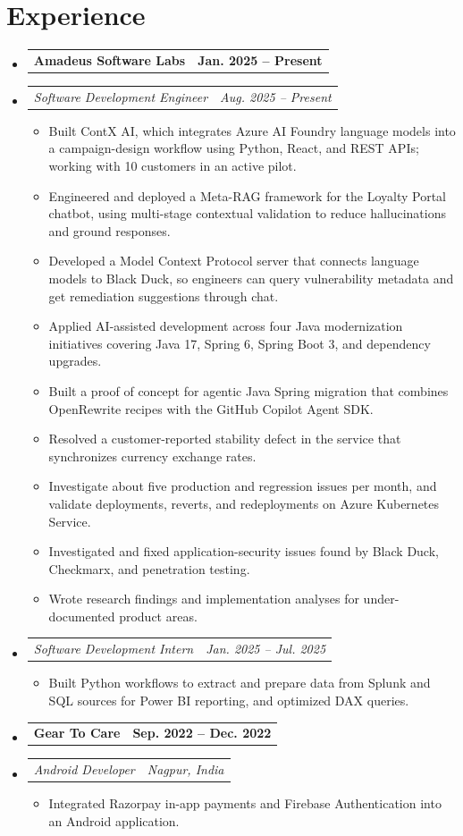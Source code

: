 \documentclass[a4paper,11pt]{article}
\makeatletter
\newcommand{\bulletpoint}[1]{\item\small{#1}}
\newcommand{\company}[2]{\item\begin{tabularx}{\textwidth}{@{}Xr@{}}\textbf{#1}& \textbf{#2}\end{tabularx}\vspace{-4pt}}
\newcommand{\role}[2]{\item\begin{tabularx}{\textwidth}{@{}Xr@{}}\textit{\small #1}&\textit{\small #2}\end{tabularx}\vspace{-5pt}}
\makeatother
\begin{document}
\section{Experience}
\begin{itemize}[leftmargin=0in,label={}]
  \company{Amadeus Software Labs}{Jan. 2025 -- Present}
  \role{Software Development Engineer}{Aug. 2025 -- Present}
  \begin{itemize}
    \bulletpoint{Built ContX AI, which integrates Azure AI Foundry language models into a campaign-design workf{}low using Python, React, and REST APIs; working with 10 customers in an active pilot.}
    \bulletpoint{Engineered and deployed a Meta-RAG framework for the Loyalty Portal chatbot, using multi-stage contextual validation to reduce hallucinations and ground responses.}
    \bulletpoint{Developed a Model Context Protocol server that connects language models to Black Duck, so engineers can query vulnerability metadata and get remediation suggestions through chat.}
    \bulletpoint{Applied AI-assisted development across four Java modernization initiatives covering Java 17, Spring 6, Spring Boot 3, and dependency upgrades.}
    \bulletpoint{Built a proof of concept for agentic Java Spring migration that combines OpenRewrite recipes with the GitHub Copilot Agent SDK.}
    \bulletpoint{Resolved a customer-reported stability defect in the service that synchronizes currency exchange rates.}
    \bulletpoint{Investigate about f{}ive production and regression issues per month, and validate deployments, reverts, and redeployments on Azure Kubernetes Service.}
    \bulletpoint{Investigated and f{}ixed application-security issues found by Black Duck, Checkmarx, and penetration testing.}
    \bulletpoint{Wrote research f{}indings and implementation analyses for under-documented product areas.}
  \end{itemize}
  \role{Software Development Intern}{Jan. 2025 -- Jul. 2025}
  \begin{itemize}
    \bulletpoint{Built Python workf{}lows to extract and prepare data from Splunk and SQL sources for Power BI reporting, and optimized DAX queries.}
  \end{itemize}
  \company{Gear To Care}{Sep. 2022 -- Dec. 2022}
  \role{Android Developer}{Nagpur, India}
  \begin{itemize}
    \bulletpoint{Integrated Razorpay in-app payments and Firebase Authentication into an Android application.}
  \end{itemize}
\end{itemize}
\end{document}
